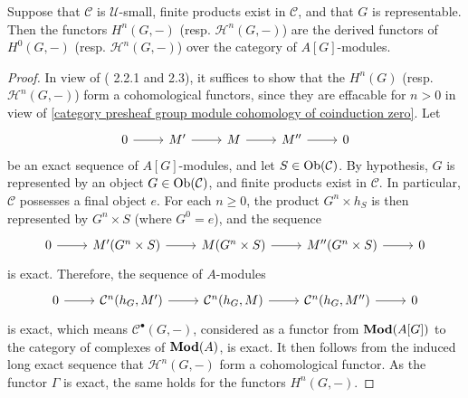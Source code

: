 \begin{proposition}\label{category presheaf group module cohomology is derived}
Suppose that $\mathcal{C}$ is $\mathscr{U}$-small, finite products exist in $\mathcal{C}$, and that $G$ is representable. Then the functors $H^n(G,-)$ (resp. $\mathcal{H}^n(G,-)$) are the derived functors of $H^0(G,-)$ (resp. $\mathcal{H}^n(G,-)$) over the category of $A[G]$-modules.
\end{proposition}
\begin{proof}
In view of (\cite{tohoku} 2.2.1 and 2.3), it suffices to show that the $H^n(G)$ (resp. $\mathcal{H}^n(G,-)$) form a cohomological functors, since they are effacable for $n>0$ in view of \cref{category presheaf group module cohomology of coinduction zero}. Let 
\[\begin{tikzcd}
0\ar[r]&M'\ar[r]&M\ar[r]&M''\ar[r]&0
\end{tikzcd}\]
be an exact sequence of $A[G]$-modules, and let $S\in\mathrm{Ob}(\mathcal{C})$. By hypothesis, $G$ is represented by an object $G\in\mathrm{Ob}(\mathcal{C})$, and finite products exist in $\mathcal{C}$. In particular, $\mathcal{C}$ possesses a final object $e$. For each $n\geq 0$, the product $G^n\times h_S$ is then represented by $G^n\times S$ (where $G^0=e$), and the sequence
\[\begin{tikzcd}
0\ar[r]&M'(G^n\times S)\ar[r]&M(G^n\times S)\ar[r]&M''(G^n\times S)\ar[r]&0
\end{tikzcd}\]
is exact. Therefore, the sequence of $A$-modules
\[\begin{tikzcd}
0\ar[r]&\mathcal{C}^n(h_G,M')\ar[r]&\mathcal{C}^n(h_G,M)\ar[r]&\mathcal{C}^n(h_G,M'')\ar[r]&0
\end{tikzcd}\]
is exact, which means $\mathcal{C}^\bullet(G,-)$, considered as a functor from $\mathbf{Mod}(A[G])$ to the category of complexes of $\mathbf{Mod}(A)$, is exact. It then follows from the induced long exact sequence that $\mathcal{H}^n(G,-)$ form a cohomological functor. As the functor $\Gamma$ is exact, the same holds for the functors $H^n(G,-)$.
\end{proof}

